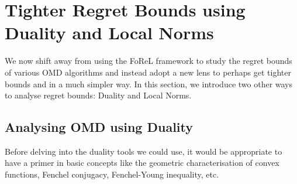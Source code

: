 \section{Tighter Regret Bounds using Duality and Local Norms}
We now shift away from using the FoReL framework to study the regret bounds of various OMD algorithms and instead adopt a new lens to perhaps get tighter bounds and in a much simpler way. In this section, we introduce two other ways to analyse regret bounds: Duality and Local Norms.

\subsection{Analysing OMD using Duality}

Before delving into the duality tools we could use, it would be appropriate to have a primer in basic concepts like the geometric characterisation of convex functions, Fenchel conjugacy, Fenchel-Young inequality, etc.

